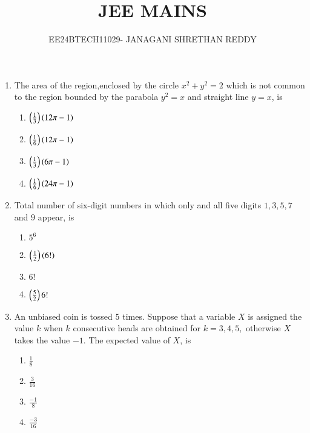\documentclass[journal,12pt,twocolumn]{IEEEtran}
\theoremstyle{remark}
\begin{document}
 


\vspace{3cm}

\title{JEE MAINS}
\author{EE24BTECH11029- JANAGANI SHRETHAN REDDY}
\maketitle{}
\newpage
\bigskip
\renewcommand{\thefigure}{\theenumi}
\renewcommand{\thetable}{\theenum}
\begin{enumerate}
    \item The area of the region,enclosed by the circle $x^2+y^2=2$ which is not common to the region bounded by the parabola $y^2=x$ and straight line $y=x$, is
    \begin{enumerate}
        \item $\left(\frac{1}{3}\right)\left(12\pi-1\right)$
        \item $\left(\frac{1}{6}\right)\left(12\pi-1\right)$
        \item $\left(\frac{1}{3}\right)\left(6\pi-1\right)$
        \item $\left(\frac{1}{6}\right)\left(24\pi-1\right)$\\
    \end{enumerate}
    \item Total number of six-digit numbers in which only and all five digits $1,3,5,7$ and $9$ appear, is
    \begin{enumerate}
        \item $5^6$
        \item $\left(\frac{1}{2}\right)\left(6!\right)$
        \item $6!$
        \item $\left(\frac{5}{2}\right)6!$\\
    \end{enumerate}
    \item An unbiased coin is tossed $5$ times. Suppose that a variable $X$ is assigned the value $k$ when $k$ consecutive heads are obtained for  $k= 3, 4, 5,$ otherwise $X$ takes the value $-1$. The expected value of $X$, is
    \begin{enumerate}
        \item $\frac{1}{8}$
        \item $\frac{3}{16}$
        \item $\frac{-1}{8}$
        \item $\frac{-3}{16}$\\
    \end{enumerate}

\end{enumerate}
\end{document}
